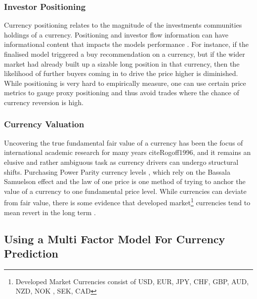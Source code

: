 \documentclass[12pt, a4paper]{article}
\begin{document}
\subsubsection{Investor Positioning}
Currency positioning relates to the magnitude of the investments communities holdings of a currency. Positioning and investor flow information can have informational content that impacts the models performance \cite{Menkhoff2012}. For instance, if the finalised model triggered a buy recommendation on a currency, but if the wider market had already built up a sizable long position in that currency, then the likelihood of further buyers coming in to drive the price higher is diminished.
While positioning is very hard to empirically measure, one can use certain price metrics to gauge proxy positioning and thus avoid trades where the chance of currency reversion is high.
\subsubsection{Currency Valuation}
Uncovering the true fundamental fair value of a currency has been the focus of international academic research for many years cite{Rogoff1996}, and it remains an elusive and rather ambiguous task as currency drivers can undergo structural shifts. Purchasing Power Parity currency levels  , which rely on the Bassala Samuelson effect and the law of one price \cite{Hassan2016} is one method of trying to anchor the value of a currency to one fundamental price level. While currencies can deviate from fair value, there is some evidence that developed market\footnote{Developed Market Currencies consist of USD, EUR, JPY, CHF, GBP, AUD, NZD, NOK , SEK, CAD} currencies tend to mean revert in the long term \cite{Zorzi2016}.


\subsection{Using a Multi Factor Model For Currency Prediction}
\end{document}
